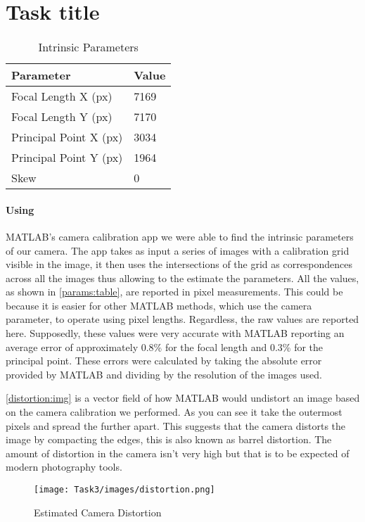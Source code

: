 \section{Task title}

\begin{table}[]
   \centering
   \begin{tabular}{l|l}
   Parameter             & Value \\ \hline
   Focal Length X (px)   & 7169  \\ \hline
   Focal Length Y (px)   & 7170  \\ \hline
   Principal Point X (px) & 3034  \\ \hline
   Principal Point Y (px) & 1964  \\ \hline
   Skew                  & 0    
   \end{tabular}
   \caption{Intrinsic Parameters}
   \label{params:table}
\end{table}

\paragraph{Using} MATLAB's camera calibration app we were able to find the intrinsic parameters of our camera. The app takes as input a series of images with a calibration grid visible in the image, it then uses the intersections of the grid as correspondences across all the images thus allowing to the estimate the parameters. All the values, as shown in \autoref{params:table}, are reported in pixel measurements. This could be because it is easier for other MATLAB methods, which use the camera parameter, to operate using pixel lengths. Regardless, the raw values are reported here. Supposedly, these values were very accurate with MATLAB reporting an average error of approximately 0.8\% for the focal length and 0.3\% for the principal point. These errors were calculated by taking the absolute error provided by MATLAB and dividing by the resolution of the images used.

\autoref{distortion:img} is a vector field of how MATLAB would undistort an image based on the camera calibration we performed. As you can see it take the outermost pixels and spread the further apart. This suggests that the camera distorts the image by compacting the edges, this is also known as barrel distortion. The amount of distortion in the camera isn't very high but that is to be expected of modern photography tools.

\begin{figure}[ht]
   \centering
   \texttt{[image: Task3/images/distortion.png]}
   \caption{Estimated Camera Distortion}
   \label{distortion:img}
\end{figure}